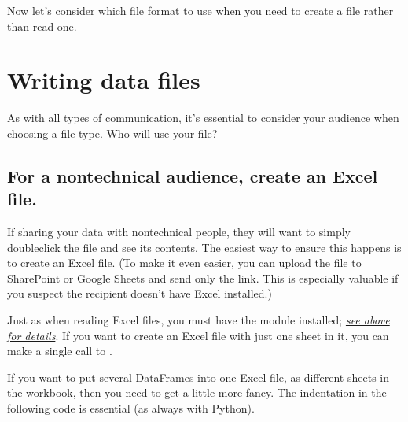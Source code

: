 \documentclass[letterpaper,10pt,english]{sphinxmanual}
\begin{document}
Now let’s consider which file format to use when you need to create a file rather than read one.


\section{Writing data files}
\label{\detokenize{chapter-13-etl:writing-data-files}}
As with all types of communication, it’s essential to consider your audience when choosing a file type.  Who will use your file?


\subsection{For a nontechnical audience, create an Excel file.}
\label{\detokenize{chapter-13-etl:for-a-nontechnical-audience-create-an-excel-file}}
If sharing your data with non\sphinxhyphen{}technical people, they will want to simply double\sphinxhyphen{}click the file and see its contents.  The easiest way to ensure this happens is to create an Excel file.  (To make it even easier, you can upload the file to SharePoint or Google Sheets and send only the link.  This is especially valuable if you suspect the recipient doesn’t have Excel installed.)

Just as when reading Excel files, you must have the  module installed; {\hyperref[\detokenize{chapter-13-etl:pretty-easy-format-to-read-xlsx}]{\emph{see above for details}}}.  If you want to create an Excel file with just one sheet in it, you can make a single call to .

\begin{sphinxVerbatim}[commandchars=\\\{\}]
  
\end{sphinxVerbatim}

If you want to put several DataFrames into one Excel file, as different sheets in the workbook, then you need to get a little more fancy.  The indentation in the following code is essential (as always with Python).

\begin{sphinxVerbatim}[commandchars=\\\{\}]
             
         
           
\end{sphinxVerbatim}
\end{document}
